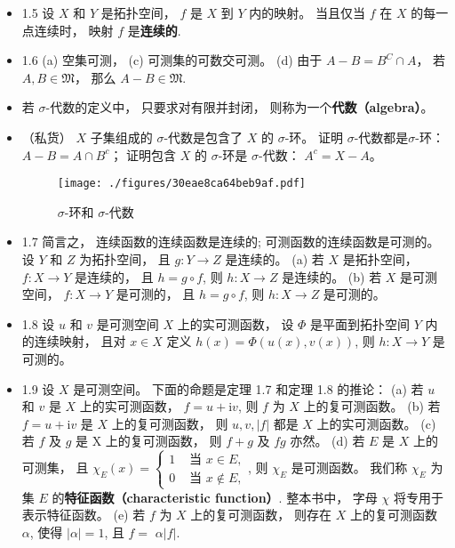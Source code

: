 \begin{itemize}
\item 1.5 设 $X$ 和 $Y$ 是拓扑空间， $f$ 是 $X$ 到 $Y$ 内的映射。 当且仅当 $f$ 在 $X$ 的每一点连续时， 映射 $f$ 是\textbf{连续的}.

\item 1.6 (a) 空集可测， (c) 可测集的可数交可测。 (d) 由于 $A-B = B^C\cap A$， 若 $A,B \in \mathfrak{M}$， 那么 $A-B\in \mathfrak{M}$.

\item 若 $\sigma$-代数的定义中， 只要求对有限并封闭， 则称为一个\textbf{代数（algebra）}。

\item （私货） $X$ 子集组成的 $\sigma$-代数是包含了 $X$ 的 $\sigma$-环。 证明 $\sigma$-代数都是$\sigma$-环： $A-B = A\cap B^c$； 证明包含 $X$ 的 $\sigma$-环是 $\sigma$-代数： $A^c = X-A$。

\begin{figure}[ht]
\centering
\texttt{[image: ./figures/30eae8ca64beb9af.pdf]}
\caption{$\sigma$-环和 $\sigma$-代数} \label{fig_AnalN4_1}
\end{figure}

\item 1.7 简言之， 连续函数的连续函数是连续的; 可测函数的连续函数是可测的。 设 $Y$ 和 $Z$ 为拓扑空间， 且 $g: Y \rightarrow Z$ 是连续的。 (a) 若 $X$ 是拓扑空间， $f: X \rightarrow Y$ 是连续的， 且 $h=g \circ f$, 则 $h: X \rightarrow Z$ 是连续的。 (b) 若 $X$ 是可测空间， $f: X \rightarrow Y$ 是可测的， 且 $h=g \circ f$, 则 $h: X \rightarrow Z$ 是可测的。 

\item 1.8 设 $u$ 和 $v$ 是可测空间 $X$ 上的实可测函数， 设 $\Phi$ 是平面到拓扑空间 $Y$ 内的连续映射， 且对 $x \in X$ 定义 $h(x)=\Phi(u(x), v(x))$, 则 $h: X \rightarrow Y$ 是可测的。

\item 1.9 设 $X$ 是可测空间。 下面的命题是定理 1.7 和定理 1.8 的推论：
(a) 若 $u$ 和 $v$ 是 $X$ 上的实可测函数， $f=u+\mathrm{i} v$, 则 $f$ 为 $X$ 上的复可测函数。 
(b) 若 $f=u+\mathrm{i} v$ 是 $X$ 上的复可测函数， 则 $u, v,|f|$ 都是 $X$ 上的实可测函数。 
(c) 若 $f$ 及 $g$ 是 $\mathrm{X}$ 上的复可测函数， 则 $f+g$ 及 $f g$ 亦然。
(d) 若 $E$ 是 $X$ 上的可测集， 且 $\chi_{E}(x)= \begin{cases}1 & \text { 当 } x \in E, \\ 0 & \text { 当 } x \notin E,\end{cases}$, 则 $\chi_{E}$ 是可测函数。 我们称 $\chi_{E}$ 为集 $E$ 的\textbf{特征函数（characteristic function）}. 整本书中， 字母 $\chi$ 将专用于表示特征函数。
(e) 若 $f$ 为 $X$ 上的复可测函数， 则存在 $X$ 上的复可测函数 $\alpha$, 使得 $|\alpha|=1$, 且 $f=$ $\alpha|f|$.


\end{itemize}
